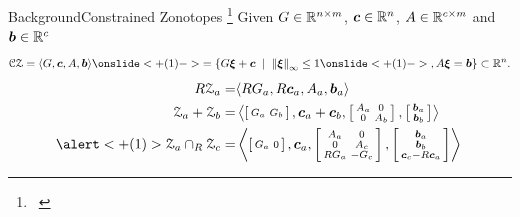 \documentclass[aspectratio=169]{conf-beamer}
\begin{document}
\begin{frame}{Background}{Constrained Zonotopes \footnote{\articlesymbol\ \cite{scott2016constrained}}}
  Given ${G\in \mathbb{R}^{n\times m}}$, ${\boldsymbol{c}\in \mathbb{R}^n}$, ${A\in\mathbb{R}^{c\times m}}$ and ${\boldsymbol{b}\in\mathbb{R}^{c}}$
  \begin{equation*}
    \set{CZ}= \langle G,\vec{c},A,\vec{b}\rangle \onslide<+(1)->{= \{G \vec{\xi} + \vec{c} \; \mid \; \norm{\vec{\xi}}_\infty \leq 1\onslide<+(1)->{, A\vec{\xi} = \vec{b}}\}}  \subset \mathbb{R}^n.
  \end{equation*}
  \pause
  \vspace{-.5cm}
  \begin{align*}
    R\set{Z}_a=&\langle RG_a,R\vec{c}_a, A_a,\vec{b}_a\rangle\\
    \set{Z}_a + \set{Z}_b=&\left\langle
                            \left[\begin{smallmatrix}
                              G_a&
                                   G_b
                            \end{smallmatrix}\right] ,\vec{c}_a+\vec{c}_b, \left[\begin{smallmatrix}
                              A_a& 0\\
                              0  & A_b
                            \end{smallmatrix}\right],
                            \left[\begin{smallmatrix}
                              \vec{b}_a\\
                              \vec{b}_b
                            \end{smallmatrix}\right]
                            \right\rangle\tikzmark{plus_node}\\
    \alert<+(1)>{\set{Z}_a\cap_R \set{Z}_c}=&\left\langle
                                              \left[\begin{smallmatrix}
                                                G_a&
                                                     0
                                              \end{smallmatrix}\right] ,\vec{c}_a, \left[\begin{smallmatrix}
                                                A_a & 0\\
                                                0   & A_c\\
                                                RG_a&  -G_c
                                              \end{smallmatrix}\right],
                                              \left[\begin{smallmatrix}
                                                \vec{b}_a\\
                                                \vec{b}_b\\
                                                \vec{c}_c-R\vec{c}_a
                                              \end{smallmatrix}\right]
                                              \right\rangle\tikzmark{cap_node}
  \end{align*}


\end{frame}
\end{document}
